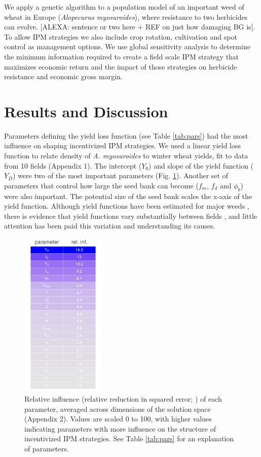 \documentclass[9pt,twocolumn,twoside,lineno]{pnas-new}
\begin{document}
We apply a genetic algorithm to a population model of an important weed of wheat in Europe (\textit{Alopecurus myosuroides}), where resistance to two herbicides can evolve. [ALEXA: sentence or two here + REF on just how damaging BG is]. To allow IPM strategies we also include crop rotation, cultivation and spot control as management options. We use global sensitivity analysis to determine the minimum information required to create a field scale IPM strategy that maximizes economic return and the impact of those strategies on herbicide resistance and economic gross margin.    

\section*{Results and Discussion}
Parameters defining the yield loss function (see Table \ref{tab:pars}) had the most influence on shaping incentivized IPM strategies. We used a linear yield loss function to relate density of \textit{A. myosuroides} to winter wheat yields, fit to data from 10 fields (Appendix 1). The intercept ($Y_0$) and slope of the yield function ($Y_D$) were two of the most important parameters (Fig. \ref{fig:rel_inf}). Another set of parameters that control how large the seed bank can become ($f_m$, $f_d$ and $\phi_b$) were also important. The potential size of the seed bank scales the x-axis of the yield function. Although yield functions have been estimated for major weeds \citep{Cous1985, Doyl1986, Swin1994}, there is evidence that yield functions vary substantially between fields \citep{Swin1994, Hick2018}, and little attention has been paid this variation and understanding its causes.
 \begin{figure}
	\centering
	\includegraphics[height=80mm]{rel_inf_mean.pdf}
	\caption{Relative influence (relative reduction in squared error; \citealp{Mill2016}) of each parameter, averaged across dimensions of the solution space (Appendix 2). Values are scaled 0 to 100, with higher values indicating parameters with more influence on the structure of incentivized IPM strategies. See Table \ref{tab:pars} for an explanation of parameters.}
	\label{fig:rel_inf} 
\end{figure}
\end{document}
